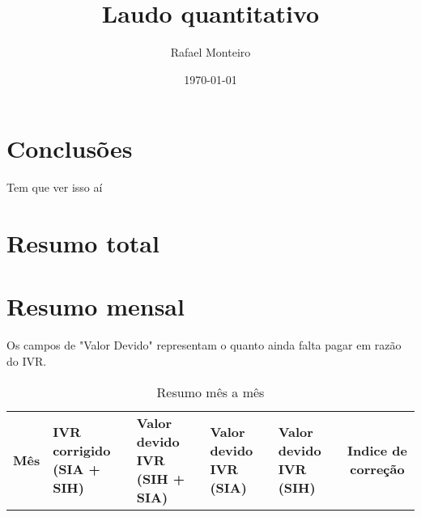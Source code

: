 \documentclass{report}
\title{Laudo quantitativo}
\author{Rafael Monteiro}
\date{\today}
\begin{document}
\maketitle

\section{Conclusões}
Tem que ver isso aí

\section{Resumo total}
\begin{tabular}
	\caption{Resumo do período completo}
\end{tabular}

\section{Resumo mensal}
Os campos de "Valor Devido" representam o quanto ainda falta pagar
em razão do IVR.

\begin{longtable}[c]{|p{2cm}|p{2.3cm}|p{2.3cm}|p{2.3cm}|p{2.3cm}|c|}
	\caption{Resumo mês a mês} \\ \hline
	\textbf{Mês} &
	\textbf{IVR corrigido (SIA + SIH)} &
	\textbf{Valor devido IVR (SIH + SIA)} &
	\textbf{Valor devido IVR (SIA)} &
	\textbf{Valor devido IVR (SIH)} &
	\textbf{Indice de correção}
	\endhead \hline

\end{longtable}

	
\end{document}
